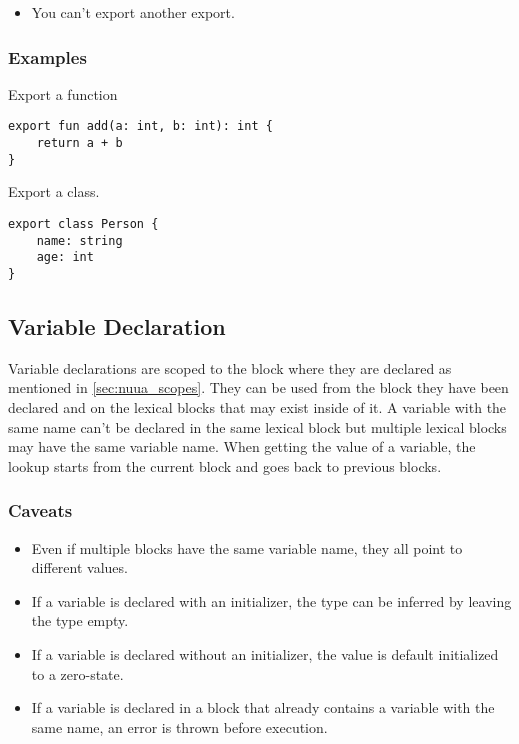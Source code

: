 \begin{itemize}
    \item You can't export another export.
\end{itemize}

\subsubsection{Examples}

Export a function
\begin{lstlisting}
export fun add(a: int, b: int): int {
    return a + b
}
\end{lstlisting}
Export a class.
\begin{lstlisting}
export class Person {
    name: string
    age: int
}
\end{lstlisting}

\subsection{Variable Declaration}

Variable declarations are scoped to the block where they are declared as mentioned in \autoref{sec:nuua_scopes}.
They can be used from the block they have been declared and on the lexical blocks that may exist inside of it.
A variable with the same name can't be declared in the same lexical block but multiple lexical
blocks may have the same variable name. When getting the value of a variable, the lookup starts from the current block and goes back to previous blocks.

\subsubsection{Caveats}

\begin{itemize}
    \item Even if multiple blocks have the same variable name, they all point to different values.
    \item If a variable is declared with an initializer, the type can be inferred by leaving the type empty.
    \item If a variable is declared without an initializer, the value is default initialized to a zero-state.
    \item If a variable is declared in a block that already contains a variable with the same name, an error is thrown before execution.
\end{itemize}

